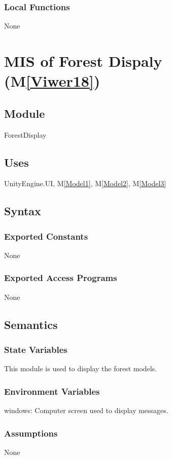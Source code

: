 \documentclass[12pt, titlepage]{article}
\newcommand{\mref}[1]{M\ref{#1}}
\begin{document}
\subsubsection{Local Functions}
None

\newpage

\section{MIS of Forest Dispaly (\mref{Viwer18})} 

\subsection{Module}
ForestDisplay

\subsection{Uses}
UnityEngine.UI, \mref{Model1}, \mref{Model2}, \mref{Model3}

\subsection{Syntax}

\subsubsection{Exported Constants}
None
\subsubsection{Exported Access Programs}
None

\subsection{Semantics}
\subsubsection{State Variables}
This module is used to display the forest models.
\subsubsection{Environment Variables}
windows: Computer screen used to display messages.
\subsubsection{Assumptions}
None
\end{document}
